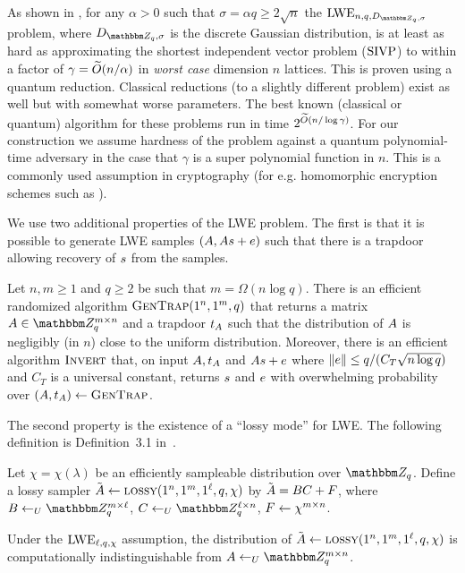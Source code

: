 As shown in \cite{regev2005,PRS17}, for any $\alpha>0$ such that  $\sigma = \alpha q \ge 2 \sqrt{n}$ the $\lwe_{n,q,D_{\mZ_q,\sigma}}$ problem,  where $D_{\mZ_q,\sigma}$ is the discrete Gaussian distribution, is at least as hard as approximating the shortest independent vector problem ($\mathrm{SIVP}$) to within a factor of $\gamma = {\widetilde{O}}({n}/\alpha)$ in \emph{worst case} dimension $n$ lattices. This is proven using a quantum reduction. Classical reductions (to a slightly different problem) exist as well \cite{Peikert09,BLPRS13} but with somewhat worse parameters. The best known (classical or quantum) algorithm for these problems run in time $2^{{\widetilde{O}}(n/\log \gamma)}$. For our construction we assume hardness of the problem against a quantum polynomial-time adversary in the case that $\gamma$ is a super polynomial function in $n$. This is a commonly used assumption in cryptography (for e.g. homomorphic encryption schemes such as \cite{fhelwe}).





We use two additional properties of the LWE problem. The first is that it is possible to generate LWE samples $(\*A,\*A\*s+\*e)$ such that there is a trapdoor allowing recovery of $\*s$ from the samples. 

\begin{theorem}\label{thm:trapdoor}
Let $n,m\geq 1$ and $q\geq 2$ be such that $m = \Omega(n\log q)$. There is an efficient randomized algorithm $\textsc{GenTrap}(1^n,1^m,q)$ that returns a matrix $\*A \in \mZ_q^{m\times n}$ and a trapdoor $t_{\*A}$ such that the distribution of $\*A$ is negligibly (in $n$) close to the uniform distribution. Moreover, there is an efficient algorithm $\textsc{Invert}$ that, on input $\*A, t_{\*A}$ and $\*A\*s+\*e$ where $\|\*e\| \leq q/(C_T\sqrt{n\log q})$ and $C_T$ is a universal constant, returns $\*s$ and $\*e$ with overwhelming probability over $(\*A,t_{\*A})\leftarrow \GenTrap$. \end{theorem}

The second property is the existence of a ``lossy mode'' for LWE. The following definition is Definition~3.1 in~\cite{lwr}. 

\begin{definition}\label{def:lossy}
Let $\chi = \chi(\lambda)$ be an efficiently sampleable distribution over $\mZ_q$. Define a lossy sampler $\tilde{\*A} \leftarrow \lossy(1^n,1^m,1^\ell,q,\chi)$ by  $\tilde{\*A} = \*B\*C +\*F$, where $\*B\leftarrow_U \mZ_q^{m\times \ell}$, $\*C\leftarrow_U \mZ_q^{\ell \times n}$, $\*F\leftarrow \chi^{m\times n}$. 
\end{definition}

\begin{theorem}\label{thm:lossy}
Under the $\mathrm{LWE}_{\ell,q,\chi}$ assumption, the distribution of $\tilde{\*A} \leftarrow \lossy(1^n,1^m,1^\ell,q,\chi)$ is computationally indistinguishable from $\*A\leftarrow_U \mZ_q^{m\times n}$. 
\end{theorem}

